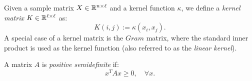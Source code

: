 \begin{definition}\label{def:notation:kernel_matrix}
Given a sample matrix $X \in \mathbb{R}^{n\times\ell}$ and a kernel function $\kappa$, we define a \emph{kernel matrix} $K \in \mathbb{R}^{\ell \times \ell}$ as:
$$ K(i,j) := \kappa(x_i, x_j).$$
A special case of a kernel matrix is the $Gram$ matrix, where the standard inner product is used as the kernel function (also referred to as the \emph{linear kernel}).
\end{definition}

\begin{definition}\label{def:notation:positive_semidefinite}
A matrix $A$ is \emph{positive semidefinite} if:
$$ x^T A x \geq 0,\quad \forall x.$$
\end{definition}

